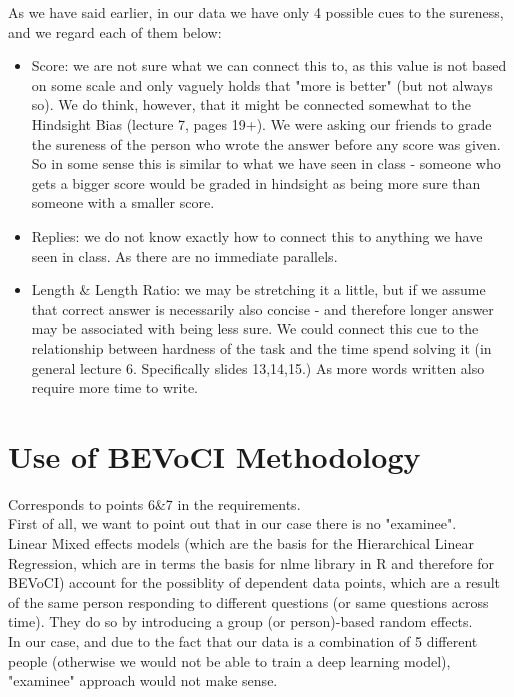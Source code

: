 \documentclass[11pt, oneside]{article}   	%
\begin{document}
As we have said earlier, in our data we have only 4 possible cues to the sureness, and we regard each of them below:
\begin{itemize}
    \item Score: we are not sure what we can connect this to, as this value is not based on some scale and only vaguely holds that "more is better" (but not always so). We do think, however, that it might be connected somewhat to the Hindsight Bias (lecture 7, pages 19+). We were asking our friends to grade the sureness of the person who wrote the answer before any score was given. So in some sense this is similar to what we have seen in class - someone who gets a bigger score would be graded in hindsight as being more sure than someone with a smaller score.
    \item Replies: we do not know exactly how to connect this to anything we have seen in class. As there are no immediate parallels.
    \item Length \& Length Ratio: we may be stretching it a little, but if we assume that correct answer is necessarily also concise - and therefore longer answer may be associated with being less sure. We could connect this cue to the relationship between hardness of the task and the time spend solving it (in general lecture 6. Specifically slides 13,14,15.) As more words written also require more time to write. 
\end{itemize}

\section{Use of BEVoCI Methodology}
Corresponds to points 6\&7 in the requirements.\\

First of all, we want to point out that in our case there is no "examinee".\\
Linear Mixed effects models (which are the basis for the Hierarchical Linear Regression, which are in terms the basis for nlme library in R and therefore for BEVoCI) account for the possiblity of dependent data points, which are a result of the same person responding to different questions (or same questions across time). They do so by introducing a group (or person)-based random effects.\\

In our case, and due to the fact that our data is a combination of 5 different people (otherwise we would not be able to train a deep learning model), "examinee" approach would not make sense.\\
\end{document}
